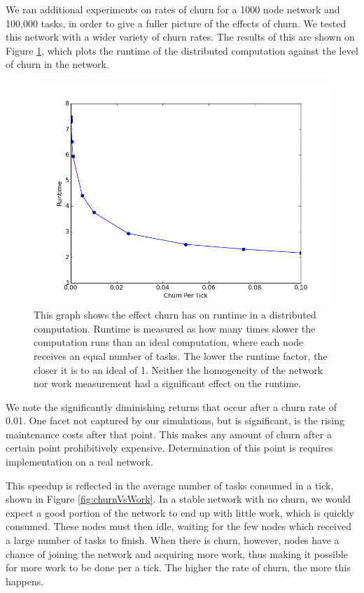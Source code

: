 \documentclass[11pt,conference]{IEEEtran}
\begin{document}
{	
	We ran additional experiments on rates of churn for a 1000 node network and 100,000 tasks, in order to give a fuller picture of the effects of churn.
	We tested this network with a wider variety of churn rates.
	The results of this are shown on Figure \ref{fig:churnVsTime}, which plots the runtime of the distributed computation against the level of churn in the network.
	
	
	\begin{figure}[h]
		\centering
		\includegraphics[width=0.7\linewidth]{figs/churnVsTime}
		\caption[Churn vs Runtime factor]{This graph shows the effect churn has on runtime in a distributed computation.
			Runtime is measured as how many times slower the computation runs than an ideal computation, where each node receives an equal number of tasks.
			The lower the runtime factor, the closer it is to an ideal of 1.
			Neither the homogeneity of the network nor work measurement had a significant effect on the runtime.}
		\label{fig:churnVsTime}
	\end{figure}
	
	We note the significantly diminishing returns that occur after a churn rate of 0.01.
	One facet not captured by our simulations, but is significant, is the rising maintenance costs after that point.
	This makes any amount of churn after a certain point prohibitively expensive.
	Determination of  this point is requires implementation on a real network.
	
	This speedup is reflected in the average number of tasks consumed in a tick, shown in Figure \ref{fig:churnVsWork}.
	In a stable network with no churn, we would expect a good portion of the network to end up with little work, which is quickly consumed.
	These nodes must then idle, waiting for the few nodes which received a large number of tasks to finish.
	When there is churn, however, nodes have a chance of joining the network and acquiring more work, thus making it possible for more work to be done per a tick.
	The higher the rate of churn, the more this happens.
	
}
\end{document}
